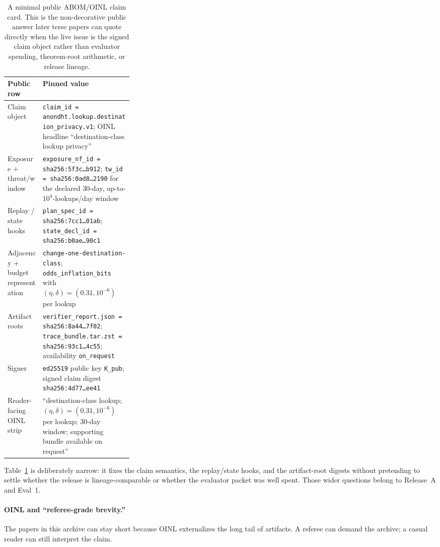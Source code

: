 \documentclass[11pt]{article}
\begin{document}
\begin{table}[t]
\centering
\small
\begin{tabularx}{0.97\linewidth}{@{}p{0.29\linewidth}X@{}}
\toprule
\textbf{Public row} & \textbf{Pinned value}\\
\midrule
Claim object & \texttt{claim\_id = anondht.lookup.destination\_privacy.v1}; OINL headline ``destination-class lookup privacy'' \\
Exposure + threat/window & \texttt{exposure\_nf\_id = sha256:5f3c\ldots b912}; \texttt{tw\_id = sha256:0ad8\ldots 2190} for the declared 30-day, up-to-\(10^4\)-lookups/day window \\
Replay / state hooks & \texttt{plan\_spec\_id = sha256:7cc1\ldots 01ab}; \texttt{state\_decl\_id = sha256:b0ae\ldots 90c1} \\
Adjacency + budget representation & \texttt{change-one-destination-class}; \texttt{odds\_inflation\_bits} with \((\eta,\delta)=(0.31,10^{-6})\) per lookup \\
Artifact roots & \texttt{verifier\_report.json = sha256:8a44\ldots 7f02}; \texttt{trace\_bundle.tar.zst = sha256:93c1\ldots 4c55}; availability \texttt{on\_request} \\
Signer & \texttt{ed25519} public key \texttt{K\_pub}; signed claim digest \texttt{sha256:4d77\ldots ee41} \\
Reader-facing OINL strip & ``destination-class lookup; \((\eta,\delta)=(0.31,10^{-6})\) per lookup; 30-day window; supporting bundle available on request'' \\
\bottomrule
\end{tabularx}
\caption{A minimal public ABOM/OINL claim card. This is the non-decorative public answer later terse papers can quote directly when the live issue is the signed claim object rather than evaluator spending, theorem-root arithmetic, or release lineage.}
\label{tab:minimal-abom-card}
\end{table}

Table~\ref{tab:minimal-abom-card} is deliberately narrow: it fixes the claim semantics, the replay/state hooks, and the artifact-root digests without pretending to settle whether the release is lineage-comparable or whether the evaluator packet was well spent. Those wider questions belong to Release~A and Eval~1.\cite{series:releaseproperty,series:evalnotary}

\paragraph{OINL and ``referee-grade brevity.''}
The papers in this archive can stay short because OINL externalizes the long tail of artifacts.
A referee can demand the archive; a casual reader can still interpret the claim.
\end{document}
